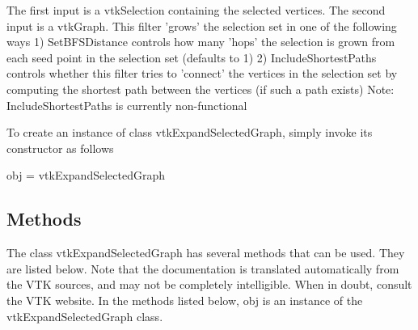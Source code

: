 The first input is a vtk\-Selection containing the selected vertices. The second input is a vtk\-Graph. This filter 'grows' the selection set in one of the following ways 1) Set\-B\-F\-S\-Distance controls how many 'hops' the selection is grown from each seed point in the selection set (defaults to 1) 2) Include\-Shortest\-Paths controls whether this filter tries to 'connect' the vertices in the selection set by computing the shortest path between the vertices (if such a path exists) Note\-: Include\-Shortest\-Paths is currently non-\/functional

To create an instance of class vtk\-Expand\-Selected\-Graph, simply invoke its constructor as follows \begin{DoxyVerb}  obj = vtkExpandSelectedGraph
\end{DoxyVerb}
 \hypertarget{vtkwidgets_vtkxyplotwidget_Methods}{}\subsection{Methods}\label{vtkwidgets_vtkxyplotwidget_Methods}
The class vtk\-Expand\-Selected\-Graph has several methods that can be used. They are listed below. Note that the documentation is translated automatically from the V\-T\-K sources, and may not be completely intelligible. When in doubt, consult the V\-T\-K website. In the methods listed below, {\ttfamily obj} is an instance of the vtk\-Expand\-Selected\-Graph class. 
